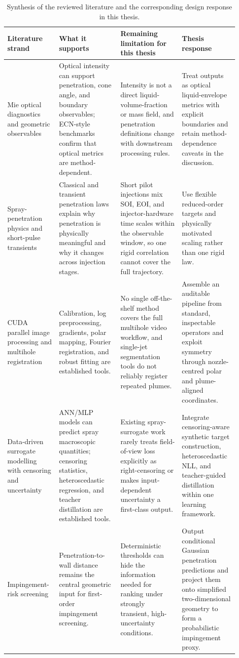 \documentclass[english, 12pt, a4paper, elec, utf8, a-2b, online]{aaltothesis}
\begin{document}
\begin{table}[t]
\centering
\footnotesize
\setlength{\tabcolsep}{2pt}
\renewcommand{\arraystretch}{1.12}
\begin{tabular}{@{}L{0.20\linewidth}L{0.25\linewidth}L{0.25\linewidth}L{0.23\linewidth}@{}}
\toprule
Literature strand & What it supports & Remaining limitation for this thesis & Thesis response \\
\midrule
Mie optical diagnostics and geometric observables & Optical intensity can support penetration, cone angle, and boundary observables; ECN-style benchmarks confirm that optical metrics are method-dependent. & Intensity is not a direct liquid-volume-fraction or mass field, and penetration definitions change with downstream processing rules. & Treat outputs as optical liquid-envelope metrics with explicit boundaries and retain method-dependence caveats in the discussion. \\
Spray-penetration physics and short-pulse transients & Classical and transient penetration laws explain why penetration is physically meaningful and why it changes across injection stages. & Short pilot injections mix SOI, EOI, and injector-hardware time scales within the observable window, so one rigid correlation cannot cover the full trajectory. & Use flexible reduced-order targets and physically motivated scaling rather than one rigid law. \\
CUDA parallel image processing and multihole registration & Calibration, log preprocessing, gradients, polar mapping, Fourier registration, and robust fitting are established tools. & No single off-the-shelf method covers the full multihole video workflow, and single-jet segmentation tools do not reliably register repeated plumes. & Assemble an auditable pipeline from standard, inspectable operators and exploit symmetry through nozzle-centred polar and plume-aligned coordinates. \\
Data-driven surrogate modelling with censoring and uncertainty & ANN/MLP models can predict spray macroscopic quantities; censoring statistics, heteroscedastic regression, and teacher distillation are established tools. & Existing spray-surrogate work rarely treats field-of-view loss explicitly as right-censoring or makes input-dependent uncertainty a first-class output. & Integrate censoring-aware synthetic target construction, heteroscedastic NLL, and teacher-guided distillation within one learning framework. \\
Impingement-risk screening & Penetration-to-wall distance remains the central geometric input for first-order impingement screening. & Deterministic thresholds can hide the information needed for ranking under strongly transient, high-uncertainty conditions. & Output conditional Gaussian penetration predictions and project them onto simplified two-dimensional geometry to form a probabilistic impingement proxy. \\
\bottomrule
\end{tabular}
\caption{Synthesis of the reviewed literature and the corresponding design response in this thesis.}
\label{tab:literature-synthesis}
\end{table}
\end{document}
